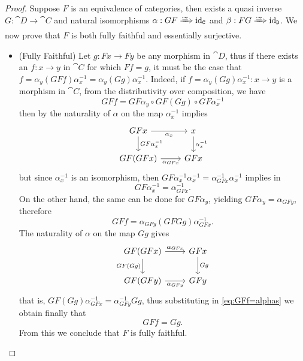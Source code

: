 \begin{proof}
    Suppose \(F\) is an equivalence of categories, then exists a quasi inverse
    \(G: \cat D \to \cat C\) and natural isomorphisms
    \(\alpha: G F \isonat \Id_{\cat C}\) and \(\beta: F G \isonat \Id_{\cat D}\). We
    now prove that \(F\) is both fully faithful and essentially surjective.

    \begin{itemize}\setlength\itemsep{0em}
        \item (Fully Faithful) Let \(g: Fx \to Fy\) be any morphism in \(\cat D\), thus
              if there exists an \(f: x \to y\) in \(\cat C\) for which \(F f = g\), it must
              be the case that
              \(f = \alpha_y (G F f) \alpha_x^{-1} = \alpha_y (G g) \alpha_x^{-1}\). Indeed,
              if \(f = \alpha_y (G g) \alpha_x^{-1}: x \to y\) is a morphism in \(\cat C\),
              from the distributivity over composition, we have
              \[
                  G F f = G F \alpha_y \circ G F (G g) \circ G F \alpha_x^{-1}
              \]
              then by the naturality of \(\alpha\) on the map \(\alpha_x^{-1}\) implies
              \[
                  \begin{tikzcd}
                      G F x \ar[d, "G F \alpha_x^{-1}"] \ar[r, "\alpha_x"']
                      & x \ar[d, "\alpha_x^{-1}"] \\
                      G F (G F x) \ar[r, "\alpha_{G F x}"'] & G F x
                  \end{tikzcd}
              \]
              but since \(\alpha_x^{-1}\) is an isomorphism, then
              \(G F \alpha_x^{-1} \alpha_x^{-1} = \alpha_{G F x}^{-1} \alpha_x^{-1}\)
              implies in
              \[
                  G F \alpha_x^{-1} = \alpha_{G F x}^{-1}.
              \]
              On the other hand, the same can be done for \(G F \alpha_y\), yielding
              \(G F \alpha_y = \alpha_{G F y}\), therefore
              \begin{equation}\label{eq:GFf=alphas}
                  G F f = \alpha_{G F y} (G F G g) \alpha_{G F x}^{-1}.
              \end{equation}
              The naturality of \(\alpha\) on the map \(G g\) gives
              \[
                  \begin{tikzcd}
                      G F (G F x) \ar[r, "\alpha_{G F x}"] \ar[d, "G F (G g)"']
                      & G F x \ar[d, "G g"] \\
                      G F (G F y) \ar[r, "\alpha_{G F y}"'] & G F y
                  \end{tikzcd}
              \]
              that is, \(G F (G g) \alpha_{G F x}^{-1} = \alpha_{G F y}^{-1} G g\), thus
              substituting in \cref{eq:GFf=alphas} we obtain finally that
              \[
                  G F f = G g.
              \]
              From this we conclude that \(F\) is fully faithful.


\end{itemize}
\end{proof}
